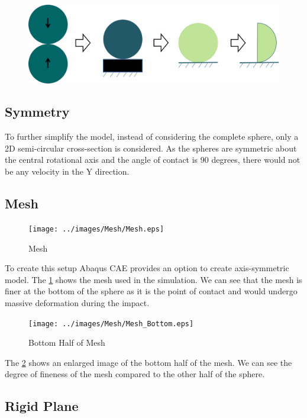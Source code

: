\begin{figure}[H]
	\centering
	\includegraphics[scale=0.5]{../images/SimulationSetup/sphere2D.png}
\end{figure}
\subsection{Symmetry}
To further simplify the model, instead of considering the complete sphere, only a 2D semi-circular cross-section is considered. As the spheres are symmetric about the central rotational axis and the angle of contact is 90 degrees, there would not be any velocity in the Y direction. 

\subsection{Mesh}

\begin{figure}[H]
    \centering
	\texttt{[image: ../images/Mesh/Mesh.eps]}
	\caption{Mesh}
	\label{fig:mesh}
\end{figure}

To create this setup Abaqus CAE provides an option to create axis-symmetric model. The \ref{fig:mesh} shows the mesh used in the simulation. We can see that the mesh is finer at the bottom of the sphere as it is the point of contact and would undergo massive deformation during the impact. 


\begin{figure}[H]
    \centering
	\texttt{[image: ../images/Mesh/Mesh\_Bottom.eps]}
	\caption{Bottom Half of Mesh}
	\label{fig:mesh_bottom_half}
\end{figure}

The \ref{fig:mesh_bottom_half} shows an enlarged image of the bottom half of the mesh. We can see the degree of fineness of the mesh compared to the other half of the sphere.


\subsection{Rigid Plane}

